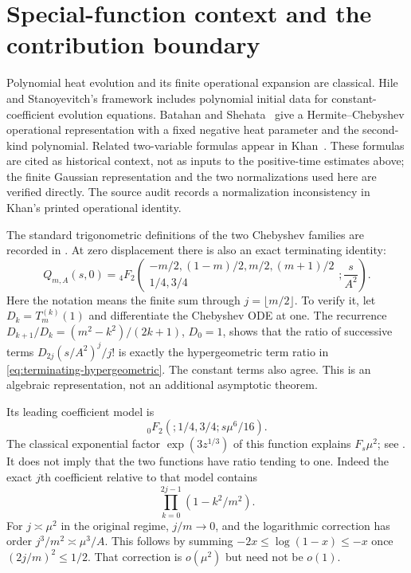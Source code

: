 \section{Special-function context and the contribution boundary}
\label{sec:literature}

Polynomial heat evolution and its finite operational expansion are
classical. Hile and Stanoyevitch's framework
\cite[Theorem 1 and (2.18)]{HileStanoyevitch2001} includes polynomial
initial data for constant-coefficient evolution equations.
Batahan and Shehata~\cite[Theorem 3.1]{BatahanShehata2014} give a
Hermite--Chebyshev operational representation with a fixed negative
heat parameter and the second-kind polynomial. Related two-variable
formulas appear in Khan~\cite{Khan2019}. These formulas are cited as
historical context, not as inputs to the positive-time estimates above;
the finite Gaussian representation and the two normalizations used here
are verified directly. The source audit records a normalization
inconsistency in Khan's printed operational identity.

The standard trigonometric definitions of the two Chebyshev families
are recorded in \cite[\S18.5]{DLMF}. At zero displacement there is also
an exact terminating identity:
\begin{equation}\label{eq:terminating-hypergeometric}
 Q_{m,A}(s,0)={}_4F_2\left(\begin{matrix}
 -m/2,(1-m)/2,m/2,(m+1)/2\\1/4,3/4
 \end{matrix};\frac{s}{A^2}\right).
\end{equation}
Here the notation means the finite sum through $j=\lfloor m/2\rfloor$.
To verify it, let $D_k=T_m^{(k)}(1)$ and differentiate the Chebyshev
ODE at one. The recurrence
$D_{k+1}/D_k=(m^2-k^2)/(2k+1)$, $D_0=1$, shows that the ratio of
successive terms $D_{2j}(s/A^2)^j/j!$ is exactly the hypergeometric
term ratio in \eqref{eq:terminating-hypergeometric}.
The constant terms also agree. This is an algebraic representation,
not an additional asymptotic theorem.

Its leading coefficient model is
\[
 {}_0F_2(;1/4,3/4;s\mu^6/16).
\]
The classical exponential factor $\exp(3z^{1/3})$ of this function
explains $F_s\mu^2$; see \cite[\S16.11]{DLMF}.
It does not imply that the two functions have ratio tending to one.
Indeed the exact $j$th coefficient relative to that model contains
\[
 \prod_{k=0}^{2j-1}(1-k^2/m^2).
\]
For $j\asymp\mu^2$ in the original regime, $j/m\to0$, and the
logarithmic correction has order $j^3/m^2\asymp\mu^3/A$.
This follows by summing
$-2x\le\log(1-x)\le-x$ once $(2j/m)^2\le1/2$.
That correction is $o(\mu^2)$ but need not be $o(1)$.

